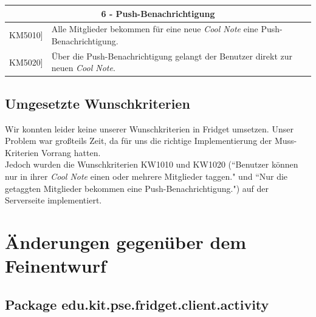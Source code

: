 \documentclass[a4paper]{scrreprt}
\begin{document}
		\vspace{5mm}
		
		\begin{table}[h!]
			\centering
			\label{my-label}
			\begin{tabular}{p{2cm}p{12cm}}
				
				\multicolumn{2}{c}{\textbf{6 - Push-Benachrichtigung}} \\ \hline
				\centering{[}KM5010{]} & Alle Mitglieder bekommen für eine neue \textit{Cool Note} eine Push-Benachrichtigung.\\
				\centering{[}KM5020{]}& Über die Push-Benachrichtigung gelangt der Benutzer direkt zur neuen \textit{Cool Note}.                               \\
				
				\hline
			\end{tabular}
		\end{table}
	\section{Umgesetzte Wunschkriterien}
	Wir konnten leider keine unserer Wunschkriterien in Fridget umsetzen. Unser Problem war großteils Zeit, da für uns die richtige Implementierung der Muss-Kriterien Vorrang hatten.\\
	Jedoch wurden die Wunschkriterien KW1010 und KW1020 (``Benutzer können nur in ihrer \textit{Cool Note} einen oder mehrere Mitglieder taggen." und ``Nur die getaggten Mitglieder bekommen eine Push-Benachrichtigung.") auf der Serverseite implementiert.\\
	
	\newpage
	
	\chapter{Änderungen gegenüber dem Feinentwurf}
	
	\section{Package edu.kit.pse.fridget.client.activity}
\end{document}
